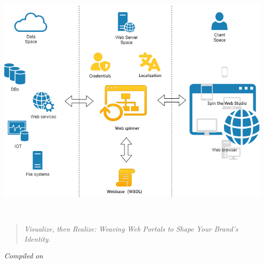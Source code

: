 \begin{titlepage}
\centering

\makeatletter
{\Huge\bfseries \@title\\[0.5cm]}

\ifx\@subtitle\@empty\else
{\Large \@subtitle\\[1.5cm]}
\fi

\vspace*{\fill}
\includegraphics[width=\textwidth]{figures/spin-the-web.png}
\vspace*{\fill}

{\large \organization\\[0.5cm]}

\begin{quote}
\centering
\textit{Visualize, then Realize: Weaving Web Portals to Shape Your Brand’s Identity.}
\end{quote}

\vspace{2em}
\begin{center}
\textit{Compiled on \DTMnow}
\end{center}

\end{titlepage}
